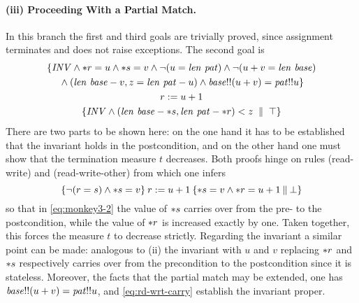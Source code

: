 \paragraph{(iii) Proceeding With a Partial Match.}
In this branch the first and third goals are trivially proved, since assignment
terminates and does not raise exceptions. The second goal is
\begin{gather}
\nonumber
\{\mathit{INV} \land {\ast r} = u\land {\ast s} = v\land \lnot(u=\mathit{len}~\mathit{pat})\land
  \lnot(u+v = \mathit{len}~\mathit{base}) \\\nonumber
  {}\land (\mathit{len}~\mathit{base} - v,  z = \mathit{len}~\mathit{pat} - u)
  \land \mathit{base}!!(u+v) = \mathit{pat}!!u\}\\
\label{eq:monkey3-2}
  {r := u + 1}\\\nonumber
  \{\mathit{INV} \land (\mathit{len}~\mathit{base} - {\ast s}, \mathit{len}~\mathit{pat} - {\ast r})
  < z \;\parallel\; \top\}
\end{gather}
There are two parts to be shown here: on the one hand it has to be established
that the invariant holds in the postcondition, and on the other hand one must
show that the termination measure $t$ decreases. Both proofs hinge on rules
(read-write) and (read-write-other) from which one infers 
\begin{equation}
\label{eq:rd-wrt-carry}
\{\lnot(r = s) \land
  {\ast s} = v\}\:r := u+1\:\{{\ast s} = v \land {\ast r} = u+1\:\|\:\bot\}
\end{equation}
so that in \eqref{eq:monkey3-2} the value of ${\ast s}$ carries over from the pre-
to the postcondition, while the value of ${\ast r}$ is increased exactly by one.
Taken together, this forces the measure $t$ to decrease strictly. Regarding the
invariant a similar point can be made: analogous to (ii) the invariant with $u$
and $v$ replacing ${\ast r}$ and ${\ast s}$ respectively carries over from the
precondition to the postcondition since it is stateless. Moreover, the facts
that the partial match may be extended, \IE one has $\mathit{base}!!(u+v) =
\mathit{pat}!!u$, and \eqref{eq:rd-wrt-carry} establish the invariant proper.



